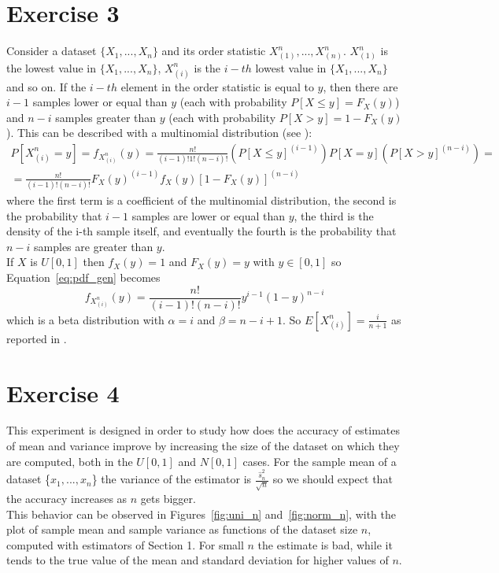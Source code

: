 \documentclass[10pt]{article}
\begin{document}
\section{Exercise 3}
Consider a dataset $\{X_1, ..., X_n\}$ and its order statistic $X_{(1)}^n, ..., X_{(n)}^n$. $X_{(1)}^n$ is the lowest value in $\{X_1, ..., X_n\}$, $X_{(i)}^n$ is the $i-th$ lowest value in $\{X_1, ..., X_n\}$ and so on. If the $i-th$ element in the order statistic is equal to $y$, then there are $i-1$ samples lower or equal than $y$ (each with probability $P[X\le y] = F_X(y)$) and $n-i$ samples greater than $y$ (each with probability $P[X > y] = 1 - F_X(y)$). This can be described with a multinomial distribution (see \cite{pk}):
\begin{multline}
P[X_{(i)}^n = y] = f_{X_{(i)}^n}(y) = \frac{n!}{(i-1)!1!(n-i)!}(P[X\le y]^{(i-1)}) P[X = y] (P[X > y]^{(n-i)}) = \\ = \frac{n!}{(i-1)!(n-i)!} F_X(y)^{(i-1)} f_X(y) [1-F_X(y)]^{(n-i)}
\label{eq:pdf_gen}
\end{multline}
where the first term is a coefficient of the multinomial distribution, the second is the probability that $i - 1$ samples are lower or equal than $y$, the third is the density of the i-th sample itself, and eventually the fourth is the probability that $n - i$ samples are greater than $y$. \\
If $X$ is $U[0,1]$ then $f_X(y) = 1$ and $F_X(y) = y$ with $y \in [0,1]$ so Equation~\ref{eq:pdf_gen} becomes
\begin{equation}
  f_{X_{(i)}^n}(y) = \frac{n!}{(i-1)!(n-i)!} y^{i-1} (1-y)^{n-i}
\end{equation}
which is a beta distribution with $\alpha = i$ and $\beta = n - i + 1$. So $E[X_{(i)}^n]= \frac{i}{n+1}$ as reported in \cite{pk}.

\newpage
\clearpage

\section{Exercise 4}
This experiment is designed in order to study how does the accuracy of estimates of mean and variance improve by increasing the size of the dataset on which they are computed, both in the $U[0,1]$ and $N[0,1]$ cases. For the sample mean of a dataset \{$x_1, ... , x_n$\} the variance of the estimator is $\frac{\hat{s}^2_n}{\sqrt{n}}$ so we should expect that the accuracy increases as $n$ gets bigger. \\
This behavior can be observed in Figures~\ref{fig:uni_n} and~\ref{fig:norm_n}, with the plot of sample mean and sample variance as functions of the dataset size $n$, computed with estimators of Section 1. For small $n$ the estimate is bad, while it tends to the true value of the mean and standard deviation for higher values of $n$. \\
\end{document}
